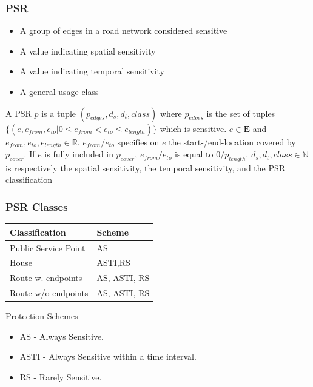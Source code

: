 \begin{frame}[red] %
\frametitle{PSR}
\begin{itemize}
\item A group of edges in a road network considered sensitive
\item A value indicating spatial sensitivity
\item A value indicating temporal sensitivity
\item A general usage class
\end{itemize}
\begin{definition}[PSR]
A PSR $p$ is a tuple $(p_{edges}, d_s, d_t, class)$ where $p_{edges}$ is the set of tuples $\{(e, e_{from}, e_{to} | 0 \leq e_{from} < e_{to} \leq e_{length})\}$ which is sensitive. 
$e \in \mathbf{E}$ and $e_{from}, e_{to}, e_{length} \in \mathbb{R}$. 
$e_{from}/e_{to}$ specifies on $e$ the start-/end-location covered by $p_{cover}$. If $e$ is fully included in $p_{cover}$, $e_{from}/e_{to}$ is equal to $0/p_{length}$.
$d_s, d_t, class \in \mathbb{N}$ is respectively the spatial sensitivity, the temporal sensitivity, and the PSR classification
\end{definition}
\end{frame}

\begin{frame}[red] %
\frametitle{PSR Classes}

\begin{table}
\begin{tabular}{|l|l|}
\hline
\bf Classification	& \bf Scheme \\\hline		
Public Service Point	& AS \\\hline
House			& ASTI,RS \\\hline
Route w. endpoints	& AS, ASTI, RS  \\\hline
Route w/o endpoints	& AS, ASTI, RS  \\\hline
\end{tabular}
\end{table}
\vspace{1em}

Protection Schemes
\begin{itemize}
	\item AS - Always Sensitive.
	\item ASTI - Always Sensitive within a time interval.
	\item RS - Rarely Sensitive.
\end{itemize}
\end{frame}


